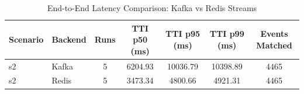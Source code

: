 \begin{table}[t]
\centering
\caption{End-to-End Latency Comparison: Kafka vs Redis Streams}
\label{tab:latency_comparison}
\begin{tabular}{l l c c c c c}
\toprule
Scenario & Backend & Runs & TTI p50 (ms) & TTI p95 (ms) & TTI p99 (ms) & Events Matched \\
\midrule
s2 & Kafka & 5 & 6204.93 & 10036.79 & 10398.89 & 4465 \\
s2 & Redis & 5 & 3473.34 & 4800.66 & 4921.31 & 4465 \\
\bottomrule
\end{tabular}
\end{table}
